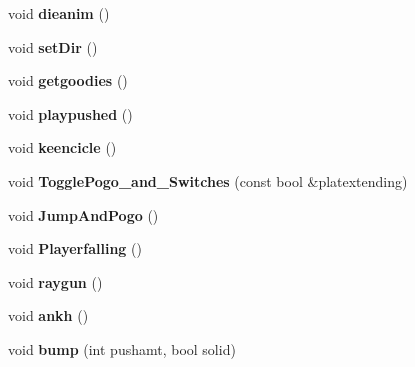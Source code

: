 \begin{DoxyCompactItemize}
\item 
\hypertarget{class_c_player_a85d0d2cc4ba73fe90a901f9a5d374f1f}{
void {\bfseries dieanim} ()}
\label{class_c_player_a85d0d2cc4ba73fe90a901f9a5d374f1f}

\item 
\hypertarget{class_c_player_aeaef04bd2f8b3e7b8a5f571a5618eac3}{
void {\bfseries setDir} ()}
\label{class_c_player_aeaef04bd2f8b3e7b8a5f571a5618eac3}

\item 
\hypertarget{class_c_player_a477e894b2918510df75ff7427b5fd040}{
void {\bfseries getgoodies} ()}
\label{class_c_player_a477e894b2918510df75ff7427b5fd040}

\item 
\hypertarget{class_c_player_aa20c66bd8ed8c7c333ffce102d874b8b}{
void {\bfseries playpushed} ()}
\label{class_c_player_aa20c66bd8ed8c7c333ffce102d874b8b}

\item 
\hypertarget{class_c_player_a93057ba412df98acc4788b1a53bf986d}{
void {\bfseries keencicle} ()}
\label{class_c_player_a93057ba412df98acc4788b1a53bf986d}

\item 
\hypertarget{class_c_player_a669bf0377e778d75d1b9cbbea9bfc335}{
void {\bfseries TogglePogo\_\-and\_\-Switches} (const bool \&platextending)}
\label{class_c_player_a669bf0377e778d75d1b9cbbea9bfc335}

\item 
\hypertarget{class_c_player_a7d594f65d174124c63b72f87de498021}{
void {\bfseries JumpAndPogo} ()}
\label{class_c_player_a7d594f65d174124c63b72f87de498021}

\item 
\hypertarget{class_c_player_afa5123f09f2e453b6fdb909ab3f2a505}{
void {\bfseries Playerfalling} ()}
\label{class_c_player_afa5123f09f2e453b6fdb909ab3f2a505}

\item 
\hypertarget{class_c_player_abf7712de9354f9b9772e57bee924d08e}{
void {\bfseries raygun} ()}
\label{class_c_player_abf7712de9354f9b9772e57bee924d08e}

\item 
\hypertarget{class_c_player_a81a9b01bc323e7dd105322a7425e91aa}{
void {\bfseries ankh} ()}
\label{class_c_player_a81a9b01bc323e7dd105322a7425e91aa}

\item 
\hypertarget{class_c_player_a2a2dcda7bf070bc60fdae5d126054dcf}{
void {\bfseries bump} (int pushamt, bool solid)}
\label{class_c_player_a2a2dcda7bf070bc60fdae5d126054dcf}


\end{DoxyCompactItemize}
